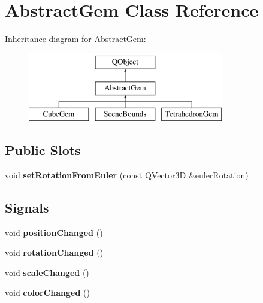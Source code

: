 \hypertarget{class_abstract_gem}{}\section{Abstract\+Gem Class Reference}
\label{class_abstract_gem}
Inheritance diagram for Abstract\+Gem\+:\begin{figure}[H]
\begin{center}
\leavevmode
\includegraphics[height=3.000000cm]{class_abstract_gem}
\end{center}
\end{figure}
\subsection*{Public Slots}
\begin{DoxyCompactItemize}
\item 
\hypertarget{class_abstract_gem_a6198aae1f2f54d73a7a5e66ca60f5f67}{}void {\bfseries set\+Rotation\+From\+Euler} (const Q\+Vector3\+D \&euler\+Rotation)\label{class_abstract_gem_a6198aae1f2f54d73a7a5e66ca60f5f67}

\end{DoxyCompactItemize}
\subsection*{Signals}
\begin{DoxyCompactItemize}
\item 
\hypertarget{class_abstract_gem_ac84dd4c9b3ea3adf02c1bfa74a29b649}{}void {\bfseries position\+Changed} ()\label{class_abstract_gem_ac84dd4c9b3ea3adf02c1bfa74a29b649}

\item 
\hypertarget{class_abstract_gem_a2702e870321deb40a8f056c1fce01094}{}void {\bfseries rotation\+Changed} ()\label{class_abstract_gem_a2702e870321deb40a8f056c1fce01094}

\item 
\hypertarget{class_abstract_gem_a7e6bfe659f09bc68222211a58c365177}{}void {\bfseries scale\+Changed} ()\label{class_abstract_gem_a7e6bfe659f09bc68222211a58c365177}

\item 
\hypertarget{class_abstract_gem_ae20ad53d4ddeff9fc13878e7db5a3253}{}void {\bfseries color\+Changed} ()\label{class_abstract_gem_ae20ad53d4ddeff9fc13878e7db5a3253}

\end{DoxyCompactItemize}

